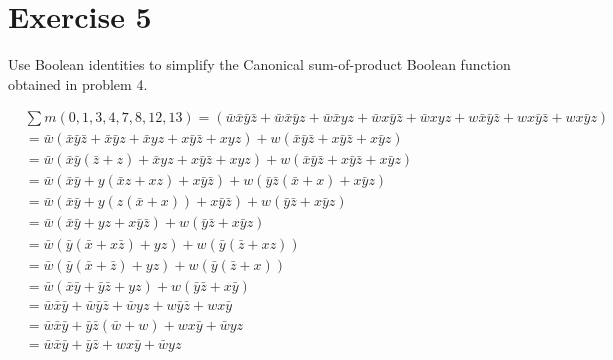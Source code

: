 \documentclass{article}
\begin{document}
    \section{Exercise 5}
    \begin{flushleft}
        Use Boolean identities to simplify the Canonical sum-of-product Boolean function
        obtained in problem 4.
    \end{flushleft}
    \begin{align*}
        &\sum m(0, 1, 3, 4, 7, 8, 12, 13) = \left(\bar{w}\bar{x}\bar{y}\bar{z} + \bar{w}\bar{x}\bar{y}z +
        \bar{w}\bar{x}yz + \bar{w}x\bar{y}\bar{z} + \bar{w}xyz + w\bar{x}\bar{y}\bar{z} + wx\bar{y}\bar{z} + wx\bar{y}z\right) \\
        &= \bar{w}(\bar{x}\bar{y}\bar{z} + \bar{x}\bar{y}z + \bar{x}yz + x\bar{y}\bar{z} + xyz) + w(\bar{x}\bar{y}\bar{z} + x\bar{y}\bar{z} + x\bar{y}z) \\
        &= \bar{w}(\bar{x}\bar{y}(\bar{z} + z) + \bar{x}yz + x\bar{y}\bar{z} + xyz) + w(\bar{x}\bar{y}\bar{z} + x\bar{y}\bar{z} + x\bar{y}z) \\
        &= \bar{w}(\bar{x}\bar{y} + y(\bar{x}z + xz) + x\bar{y}\bar{z}) + w(\bar{y}\bar{z}(\bar{x} + x) + x\bar{y}z) \\
        &= \bar{w}(\bar{x}\bar{y} + y(z(\bar{x} + x)) + x\bar{y}\bar{z}) + w(\bar{y}\bar{z} + x\bar{y}z) \\
        &= \bar{w}(\bar{x}\bar{y} + yz+ x\bar{y}\bar{z}) + w(\bar{y}\bar{z} + x\bar{y}z) \\
        &= \bar{w}(\bar{y}(\bar{x} + x\bar{z}) + yz) + w(\bar{y}(\bar{z} + xz)) \\
        &= \bar{w}(\bar{y}(\bar{x} + \bar{z}) + yz) + w(\bar{y}(\bar{z} + x)) \\
        &= \bar{w}(\bar{x}\bar{y} + \bar{y}\bar{z} + yz) + w(\bar{y}\bar{z} + x\bar{y}) \\
        &= \bar{w}\bar{x}\bar{y}+ \bar{w}\bar{y}\bar{z} + \bar{w}yz + w\bar{y}\bar{z} + wx\bar{y} \\
        &= \bar{w}\bar{x}\bar{y} + \bar{y}\bar{z}(\bar{w} + w) + wx\bar{y} + \bar{w}yz \\
        &= \bar{w}\bar{x}\bar{y} + \bar{y}\bar{z} + wx\bar{y} + \bar{w}yz \\
    \end{align*}

\end{document}
